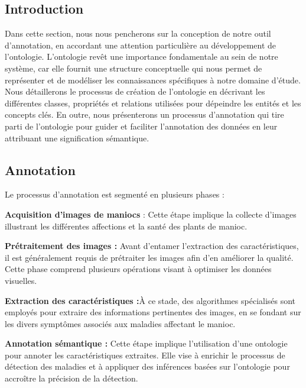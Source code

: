 \documentclass{article}
\begin{document}
	\subsection{Introduction}
	\quad Dans cette section, nous nous pencherons sur la conception de notre outil d'annotation, en accordant une attention particulière au développement de l'ontologie. L'ontologie revêt une importance fondamentale au sein de notre système, car elle fournit une structure conceptuelle qui nous permet de représenter et de modéliser les connaissances spécifiques à notre domaine d'étude. Nous détaillerons le processus de création de l'ontologie en décrivant les différentes classes, propriétés et relations utilisées pour dépeindre les entités et les concepts clés. En outre, nous présenterons un processus d'annotation qui tire parti de l'ontologie pour guider et faciliter l'annotation des données en leur attribuant une signification sémantique.
	
	\subsection{Annotation}
	Le processus d'annotation est segmenté en plusieurs phases :
	
	\textemdash \textbf{ Acquisition d'images de maniocs }: Cette étape implique la collecte d'images illustrant les différentes affections et la santé des plants de manioc.
	
	\textemdash \textbf{ Prétraitement des images : }Avant d'entamer l'extraction des caractéristiques, il est généralement requis de prétraiter les images afin d'en améliorer la qualité. Cette phase comprend plusieurs opérations visant à optimiser les données visuelles.
	
	\textemdash \textbf{ Extraction des caractéristiques :}À ce stade, des algorithmes spécialisés sont employés pour extraire des informations pertinentes des images, en se fondant sur les divers symptômes associés aux maladies affectant le manioc.
	
	\textemdash \textbf{ Annotation sémantique : }Cette étape implique l'utilisation d'une ontologie pour annoter les caractéristiques extraites. Elle vise à enrichir le processus de détection des maladies et à appliquer des inférences basées sur l'ontologie pour accroître la précision de la détection.
	
\end{document}
